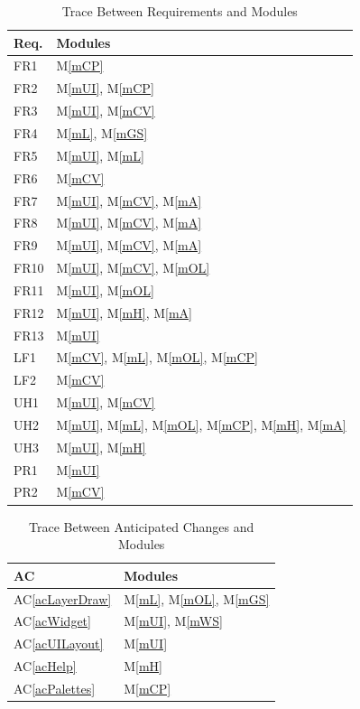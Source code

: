 \documentclass[12pt, titlepage]{article}
\newcommand{\acref}[1]{AC\ref{#1}}
\newcommand{\mref}[1]{M\ref{#1}}
\begin{document}
\begin{table}[H]
\centering
\begin{tabular}{p{} p{}}
\toprule
\textbf{Req.} & \textbf{Modules}\\
\midrule
FR1 & \mref{mCP}\\
FR2 & \mref{mUI}, \mref{mCP}\\
FR3 & \mref{mUI}, \mref{mCV}\\
FR4 & \mref{mL}, \mref{mGS}\\
FR5 & \mref{mUI}, \mref{mL}\\
FR6 & \mref{mCV}\\
FR7 & \mref{mUI}, \mref{mCV}, \mref{mA}\\
FR8 & \mref{mUI}, \mref{mCV}, \mref{mA}\\
FR9 & \mref{mUI}, \mref{mCV}, \mref{mA}\\
FR10 & \mref{mUI}, \mref{mCV}, \mref{mOL}\\
FR11 & \mref{mUI}, \mref{mOL}\\
FR12 & \mref{mUI}, \mref{mH}, \mref{mA}\\
FR13 & \mref{mUI}\\
LF1 & \mref{mCV}, \mref{mL}, \mref{mOL}, \mref{mCP}\\
LF2 & \mref{mCV}\\
UH1 & \mref{mUI}, \mref{mCV}\\
UH2 & \mref{mUI}, \mref{mL}, \mref{mOL}, \mref{mCP}, \mref{mH}, \mref{mA}\\
UH3 & \mref{mUI}, \mref{mH}\\
PR1 & \mref{mUI}\\
PR2 & \mref{mCV}\\
\bottomrule
\end{tabular}
\caption{Trace Between Requirements and Modules}
\label{TblRT}
\end{table}

\begin{table}[H]
\centering
\begin{tabular}{p{} p{}}
\toprule
\textbf{AC} & \textbf{Modules}\\
\midrule
\acref{acLayerDraw} & \mref{mL}, \mref{mOL}, \mref{mGS}\\
\acref{acWidget} & \mref{mUI}, \mref{mWS}\\
\acref{acUILayout} & \mref{mUI}\\
\acref{acHelp} & \mref{mH}\\
\acref{acPalettes} & \mref{mCP}\\
\bottomrule
\end{tabular}
\caption{Trace Between Anticipated Changes and Modules}
\label{TblACT}
\end{table}
\end{document}
